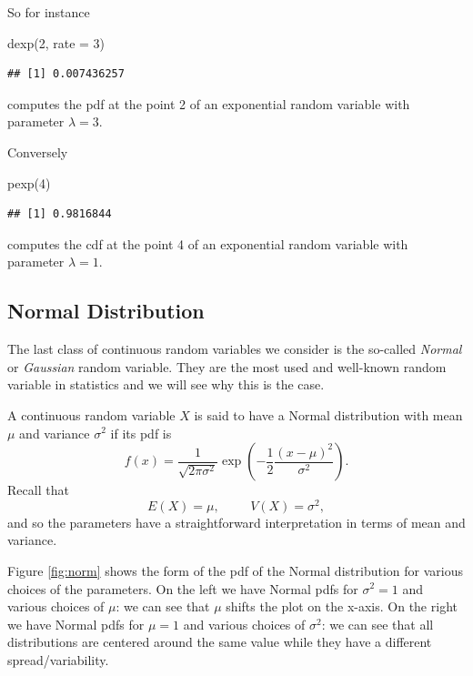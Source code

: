 \documentclass[
]{book}
\newenvironment{Shaded}{\begin{snugshade}}{\end{snugshade}}
\newcommand{\AttributeTok}[1]{\textcolor[rgb]{0.77,0.63,0.00}{#1}}
\newcommand{\DecValTok}[1]{\textcolor[rgb]{0.00,0.00,0.81}{#1}}
\newcommand{\FunctionTok}[1]{\textcolor[rgb]{0.00,0.00,0.00}{#1}}
\newcommand{\NormalTok}[1]{#1}
\theoremstyle{definition}
\theoremstyle{definition}
\theoremstyle{definition}
\theoremstyle{definition}
\theoremstyle{remark}
\begin{document}
So for instance

\begin{Shaded}
\begin{Highlighting}[]
\FunctionTok{dexp}\NormalTok{(}\DecValTok{2}\NormalTok{, }\AttributeTok{rate =} \DecValTok{3}\NormalTok{)}
\end{Highlighting}
\end{Shaded}

\begin{verbatim}
## [1] 0.007436257
\end{verbatim}

computes the pdf at the point 2 of an exponential random variable with parameter \(\lambda =3\).

Conversely

\begin{Shaded}
\begin{Highlighting}[]
\FunctionTok{pexp}\NormalTok{(}\DecValTok{4}\NormalTok{)}
\end{Highlighting}
\end{Shaded}

\begin{verbatim}
## [1] 0.9816844
\end{verbatim}

computes the cdf at the point 4 of an exponential random variable with parameter \(\lambda =1\).

\hypertarget{normal-distribution}{%
\subsection{Normal Distribution}\label{normal-distribution}}

The last class of continuous random variables we consider is the so-called \emph{Normal} or \emph{Gaussian} random variable. They are the most used and well-known random variable in statistics and we will see why this is the case.

A continuous random variable \(X\) is said to have a Normal distribution with mean \(\mu\) and variance \(\sigma^2\) if its pdf is
\[
f(x) = \frac{1}{\sqrt{2\pi\sigma^2}}\exp\left(-\frac{1}{2}\frac{(x-\mu)^2}{\sigma^2}\right).
\]
Recall that
\[
E(X)=\mu, \hspace{1cm} V(X)=\sigma^2,
\]
and so the parameters have a straightforward interpretation in terms of mean and variance.

Figure \ref{fig:norm} shows the form of the pdf of the Normal distribution for various choices of the parameters. On the left we have Normal pdfs for \(\sigma^2=1\) and various choices of \(\mu\): we can see that \(\mu\) shifts the plot on the x-axis. On the right we have Normal pdfs for \(\mu=1\) and various choices of \(\sigma^2\): we can see that all distributions are centered around the same value while they have a different spread/variability.
\end{document}
